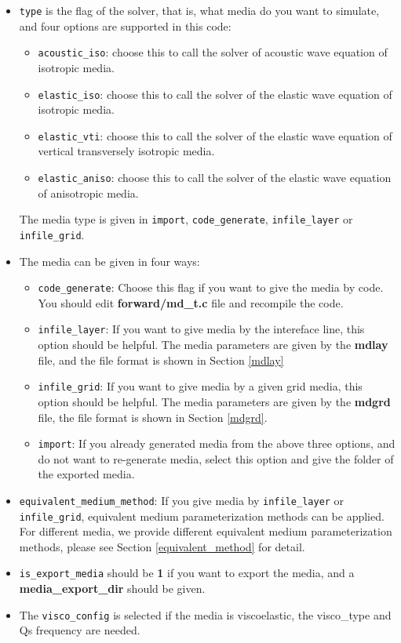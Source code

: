\begin{itemize}
  \item \texttt{type} is the flag of the solver, that is, what media do you want to simulate, and four options are supported in this code:
  \begin{itemize}
    \item \texttt{acoustic\_iso}: choose this to call the solver of acoustic wave equation of isotropic media.  
    \item \texttt{elastic\_iso}: choose this to call the solver of the elastic wave equation of isotropic media.
    \item \texttt{elastic\_vti}: choose this to call the solver of the elastic wave equation of vertical transversely isotropic media. 
    \item \texttt{elastic\_aniso}: choose this to call the solver of the elastic wave equation of anisotropic media. 
  \end{itemize}
  The media type is given in \texttt{import}, \texttt{code\_generate}, \texttt{infile\_layer} or \texttt{infile\_grid}.
  
  \item The media can be given in four ways:
  \begin{itemize}  
    \item \texttt{code\_generate}: Choose this flag if you want to give the media by code. You should edit \textbf{forward/md\_t.c} file and recompile the code.
    \item \texttt{infile\_layer}: If you want to give media by the intereface line, this option should be helpful. The media parameters are given by the \textbf{mdlay} file, and the file format is shown in Section \ref{mdlay} 
    \item \texttt{infile\_grid}: If you want to give media by a given grid media, this option should be helpful. The media parameters are given by the \textbf{mdgrd} file, the file format is shown in Section \ref{mdgrd}.
    \item \texttt{import}: If you already generated media from the above three options, and do not want to re-generate media, select this option and give the folder of the exported media. 
  \end{itemize}
  
  \item \texttt{equivalent\_medium\_method}: If you give media by \texttt{infile\_layer} or \texttt{infile\_grid}, equivalent medium parameterization methods can be applied. For different media, we provide different equivalent medium parameterization methods, please see Section \ref{equivalent_method} for detail.
  
  \item \texttt{is\_export\_media} should be \textbf{1} if you want to export the media, and a \textbf{media\_export\_dir} should be given. 
  
  \item The \texttt{visco\_config} is selected if the media is viscoelastic, the visco\_type and Qs frequency are needed.

\end{itemize}


